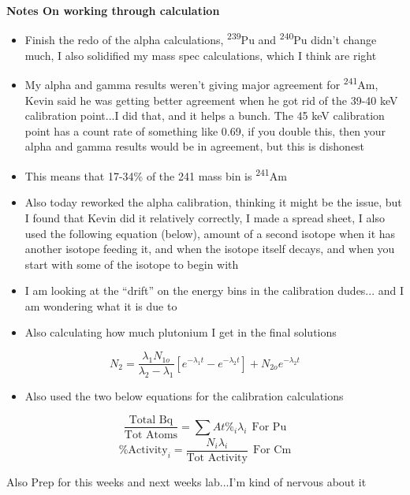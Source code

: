 \documentclass[idxtotoc,hyperref,openany,oneside]{labbook} %
\newcommand{\tss}{\textsuperscript}
\begin{document}
\textbf{Notes On working through calculation}
\begin{itemize}
\item{Finish the redo of the alpha calculations, \tss{239}Pu and \tss{240}Pu
  didn't change much, I also solidified my mass spec calculations, which
  I think are right}
\item{My alpha and gamma results weren't giving major agreement for \tss{241}Am,
  Kevin said he was getting better agreement when he got rid of the 39-40 keV
  calibration point...I did that, and it helps a bunch. The 45 keV calibration
  point has a count rate of something like 0.69, if you double this, then your alpha
  and gamma results would be in agreement, but this is dishonest}
\item{This means that 17-34\% of the 241 mass bin is \tss{241}Am}
\item{Also today reworked the alpha calibration, thinking it might be the issue,
  but I found that Kevin did it relatively correctly, I made a spread sheet,
  I also used the following equation (below), amount of a second isotope when it has
  another isotope feeding it, and when the isotope itself decays, and when you start with
some of the isotope to begin with}
\item{I am looking at the ``drift'' on the energy bins in the calibration dudes...
  and I am wondering what it is due to}
\item{Also calculating how much plutonium I get in the final solutions}
\end{itemize}
\begin{equation*}
  N_2=\frac{\lambda_1N_{1o}}{\lambda_2-\lambda_1}\left[e^{-\lambda_1t}-e^{-\lambda_2t}\right]
  +N_{2o}e^{-\lambda_2t}
\end{equation*}
\begin{itemize}
\item{Also used the two below equations for the calibration calculations}
\end{itemize}
\begin{equation*}
\frac{\text{Total Bq}}{\text{Tot Atoms}}=\sum At\%_i\lambda_i\ \ \text{For Pu}
\end{equation*}
\begin{equation*}
\text{\% Activity}_i=\frac{N_i\lambda_i}{\text{Tot Activity}}\ \ \text{For Cm}
\end{equation*}




Also Prep for this weeks and next weeks lab...I'm kind of nervous about it
\end{document}
